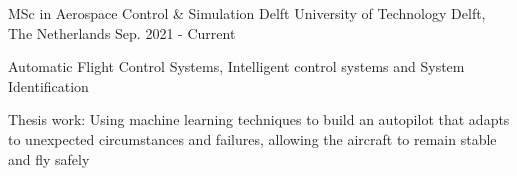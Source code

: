   \cventry
    {MSc in Aerospace Control \& Simulation} %
    {Delft University of Technology} %
    {Delft, The Netherlands} %
    {Sep. 2021 - Current} %
    {
      \begin{cvitems} %
        \item {Automatic Flight Control Systems, Intelligent control systems and System Identification}
        \item {Thesis work: Using machine learning techniques to build an autopilot that adapts to unexpected circumstances and failures, allowing the aircraft to remain stable and fly safely}
      \end{cvitems}
    }


